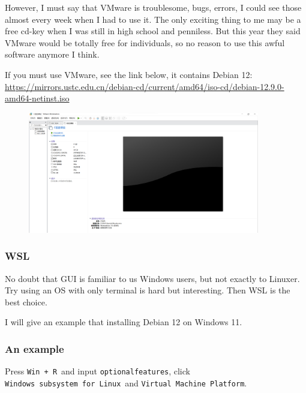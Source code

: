 \documentclass[12pt]{ctexart}
\begin{document}
However, I must say that VMware is troublesome, bugs, errors, I could
see those almost every week when I had to use it. The only exciting
thing to me may be a free cd-key when I was still in high school and
penniless. But this year they said VMware would be totally free for
individuals, so no reason to use this awful software anymore I think.

If you must use VMware, see the link below, it contains Debian 12:
\href{https://mirrors.ustc.edu.cn/debian-cd/current/amd64/iso-cd/debian-12.9.0-amd64-netinst.iso}{https://mirrors.ustc.edu.cn/debian-cd/current/amd64/iso-cd/debian-12.9.0-amd64-netinst.iso}

\begin{figure}[H]
    \centering
    \includegraphics[width=0.9\textwidth,keepaspectratio]{assets/Linux/1.1 How to install Debian on Windows/1.png}
\end{figure}

\subsubsection{\textbf{WSL}}

No doubt that GUI is familiar to us Windows users, but not exactly to
Linuxer. Try using an OS with only terminal is hard but interesting.
Then WSL is the best choice.

I will give an example that installing Debian 12 on Windows 11.

\subsubsection*{\textbf{An example}}

Press \texttt{Win\ +\ R}\ and input \texttt{optionalfeatures}, click 
\texttt{Windows\ subsystem\ for\ Linux}\ and \texttt{Virtual\ Machine\ Platform}.
\end{document}
